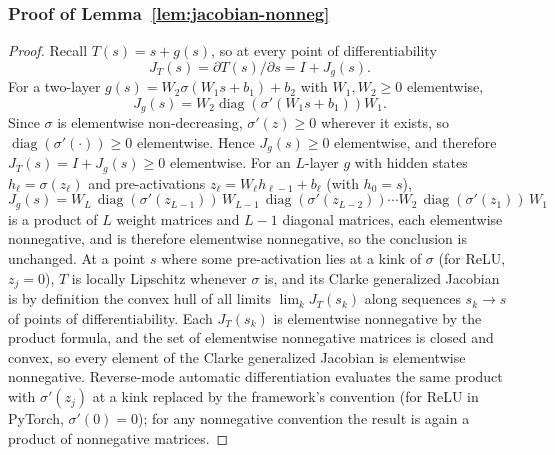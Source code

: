 \documentclass{article}
\theoremstyle{plain}
\theoremstyle{definition}
\theoremstyle{remark}
\begin{document}
\subsubsection{Proof of Lemma~\ref{lem:jacobian-nonneg}}

\label{prf:jac}
\begin{proof}
Recall $T(s)=s+g(s)$, so at every point of differentiability
\[
J_T(s)=\partial T(s)/\partial s=I + J_g(s).
\]
For a two-layer $g(s)=W_2 \sigma(W_1 s + b_1)+b_2$ with $W_1,W_2\ge 0$ elementwise,
\[
J_g(s)=W_2 \operatorname{diag}(\sigma'(W_1 s + b_1)) W_1.
\]
Since $\sigma$ is elementwise non-decreasing, $\sigma'(z)\ge 0$ wherever it exists,
so $\operatorname{diag}(\sigma'(\cdot))\ge 0$ elementwise. Hence $J_g(s)\ge 0$
elementwise, and therefore $J_T(s)=I+J_g(s)\ge 0$ elementwise.
For an $L$-layer $g$ with hidden states $h_\ell = \sigma(z_\ell)$ and pre-activations
$z_\ell = W_\ell h_{\ell-1} + b_\ell$ (with $h_0 = s$),
\[
J_g(s)=W_L\,\operatorname{diag}(\sigma'(z_{L-1}))\,W_{L-1}\,\operatorname{diag}(\sigma'(z_{L-2}))\cdots W_2\,\operatorname{diag}(\sigma'(z_1))\,W_1
\]
is a product of
$L$ weight matrices and $L-1$ diagonal matrices, each elementwise nonnegative, and is
therefore elementwise nonnegative, so the conclusion is unchanged. At a point $s$ where
some pre-activation lies at a kink of $\sigma$ (for ReLU, $z_j = 0$), $T$ is locally
Lipschitz whenever $\sigma$ is, and its Clarke generalized Jacobian is by definition the
convex hull of all limits $\lim_k J_T(s_k)$ along sequences $s_k \to s$ of points of
differentiability. Each $J_T(s_k)$ is elementwise nonnegative by the product formula,
and the set of elementwise nonnegative matrices is closed and convex, so every element
of the Clarke generalized Jacobian is elementwise nonnegative. Reverse-mode automatic
differentiation evaluates the same product with $\sigma'(z_j)$ at a kink replaced by the
framework's convention (for ReLU in PyTorch, $\sigma'(0)=0$); for any nonnegative
convention the result is again a product of nonnegative matrices.
\end{proof}
\end{document}
